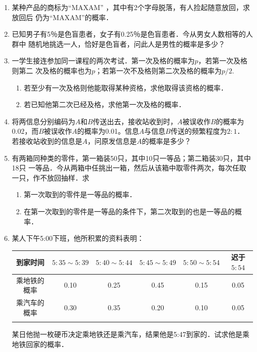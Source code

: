 \documentclass[10pt,a4paper]{article}
\begin{document}
\begin{enumerate}
    \item 某种产品的商标为“MAXAM” ，其中有2个字母脱落，有人捡起随意放回，求放回后
    仍为“MAXAM”的概率．


    \item 已知男子有5％是色盲患者，女子有0.25％是色盲患者．今从男女人数相等的人群中
    随机地挑选一人，恰好是色盲者，问此人是男性的概率是多少？

    
    \item 一学生接连参加同一课程的两次考试．第一次及格的概率为$p$，若第一次及格则第二
    次及格的概率也为$p$；若第一次不及格则第二次及格的概率为$p/2$.
    \begin{enumerate}
        \item 若至少有一次及格则他能取得某种资格，求他取得该资格的概率．
        \item 若已知他第二次已经及格，求他第一次及格的概率．
    \end{enumerate}



    \item 将两信息分别编码为$A$和$B$传送出去，接收站收到时，$A$被误收作$B$的概率为
    0.02，而$B$被误收作$A$的概率为0.01。信息$A$与信息$B$传送的频繁程度为$2:1$．
    若接收站收到的信息是$A$，问原发信息是$A$的概率是多少？


    \item 有两箱同种类的零件，第一箱装50只，其中10只一等品；第二箱装30只，其中18只
    一等品．今从两箱中任挑出一箱，然后从该箱中取零件两次，每次任取一只，作不放回抽样．求
    \begin{enumerate}
        \item 第一次取到的零件是一等品的概率．
        \item 在第一次取到的零件是一等品的条件下，第二次取到的也是一等品的概率．
    \end{enumerate}

    \item 某人下午5:00下班，他所积累的资料表明：
    
    \begin{table}[h]\centering        
        \begin{tabular*}{\hsize}{cccccc}
        \hline
        \multicolumn{1}{c|}{到家时间}   & $5:35 \sim 5:39$     & $5:40 \sim 5:44$     & $5:45 \sim 5:49$     & $5:50 \sim 5:54$     & 迟于$5:54$             \\ \hline
        \multicolumn{1}{c|}{乘地铁的概率} & 0.10                 & 0.25                 & 0.45                 & 0.15                 & 0.05                 \\ \hline
        \multicolumn{1}{c|}{乘汽车的概率} & 0.30                 & 0.35                 & 0.20                 & 0.10                 & 0.05                 \\ \hline
        \multicolumn{1}{l}{}        & \multicolumn{1}{l}{} & \multicolumn{1}{l}{} & \multicolumn{1}{l}{} & \multicolumn{1}{l}{} & \multicolumn{1}{l}{}
        \end{tabular*}   
    \end{table}
    \vspace{-1cm}
    某日他抛一枚硬币决定乘地铁还是乘汽车，结果他是5:47到家的．试求他是乘地铁回家的概率．



\end{enumerate}
\end{document}
